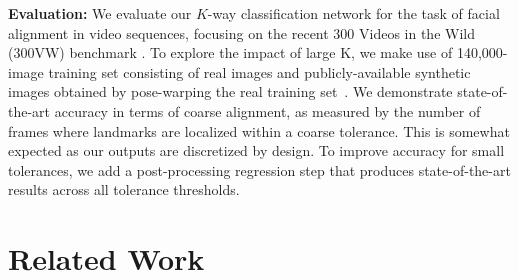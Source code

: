 \documentclass[letterpaper]{article} %
\begin{document}
{\bf Evaluation:} We evaluate our $K$-way classification network for the task of facial alignment in video sequences, focusing on the recent 300 Videos in the Wild (300VW) benchmark \cite{shen2015first,Chrysos2017ACP}. To explore the impact of large K, we make use of 140,000-image training set consisting of real images and publicly-available synthetic images obtained by pose-warping the real training set~\cite{Zhu2016FaceAA}.
We demonstrate state-of-the-art accuracy in terms of coarse alignment, as measured by the number of frames where landmarks are localized within a coarse tolerance. This is somewhat expected as our outputs are discretized by design. To improve accuracy for small tolerances, we add a post-processing regression step that produces state-of-the-art results across all tolerance thresholds.



\section{Related Work}
\setcounter{secnumdepth}{2}
\end{document}
